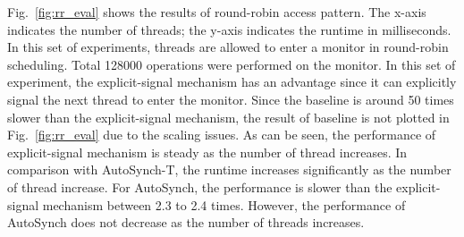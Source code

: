 \documentclass[preprint]{sigplanconf}
\begin{document}
%


%
Fig.~\ref{fig:rr_eval} shows the results of round-robin access pattern. The
x-axis indicates the number of threads; the y-axis indicates the
runtime in milliseconds. In this set of experiments, threads are allowed to enter a
monitor in round-robin scheduling. Total 128000 operations were performed on 
the monitor. In this set of experiment, the explicit-signal mechanism has an 
advantage since it can explicitly signal the next thread to enter the 
monitor. Since the baseline is around 50 times slower than the explicit-signal
mechanism, the result of baseline is not plotted in Fig.~\ref{fig:rr_eval} due
to the scaling issues. 
As can be seen, the performance of explicit-signal mechanism is steady 
as the number of thread increases. In comparison with AutoSynch-T, the runtime 
increases significantly as the number of thread increase. For AutoSynch, the 
performance is slower than the explicit-signal mechanism between 2.3 to 2.4
times. However, the performance of AutoSynch does not decrease as the number of
threads increases. 
\end{document}
